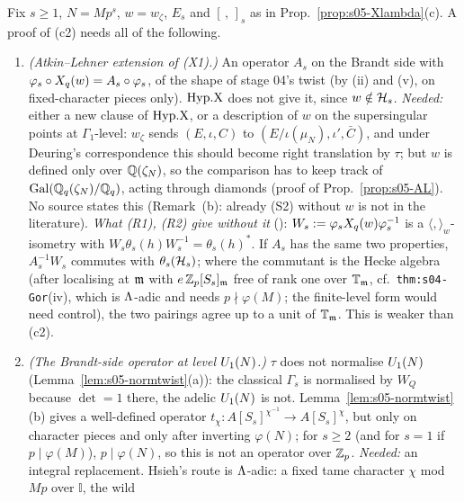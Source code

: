 \begin{remark}\label{rem:s05-c2open}
Fix $s\ge1$, $N=Mp^s$, $w=w_\zeta$, $E_s$ and $[\,,\,]_s$ as in Prop.~\ref{prop:s05-Xlambda}(c). A proof of (c2) needs all of the following.
\begin{enumerate}[label=(\roman*)]
\item \emph{(Atkin--Lehner extension of (X1).)} An operator $A_s$ on the Brandt side with $\varphi_s\circ X_q(w)=A_s\circ\varphi_s$, of the shape of stage 04's
  twist (by (ii) and (v), on fixed-character pieces only). $\mathrm{Hyp.X}$ does not give it, since $w\notin\mathcal{H}_s$. \emph{Needed:} either a new clause of $\mathrm{Hyp.X}$, or a
  description of $w$ on the supersingular points at $\Gamma_1$-level: $w_\zeta$ sends $(E,\iota,C)$ to $(E/\iota(\mu_N),\iota',\bar C)$, and under Deuring's
  correspondence this should become right translation by $\tau$; but $w$ is defined only over $\mathbb{Q}(\zeta_N)$, so the comparison has to keep track of
  $\mathrm{Gal}(\mathbb{Q}_q(\zeta_N)/\mathbb{Q}_q)$, acting through diamonds (proof of Prop.~\ref{prop:s05-AL}). No source states this (Remark~(b): already (S2) without $w$ is
  not in the literature). \emph{What (R1), (R2) give without it} (\stsketch): $W_s:=\varphi_sX_q(w)\varphi_s^{-1}$ is a $\langle,\rangle_w$-isometry with
  $W_s\theta_s(h)W_s^{-1}=\theta_s(h)^*$. If $A_s$ has the same two properties, $A_s^{-1}W_s$ commutes with $\theta_s(\mathcal{H}_s)$; where the commutant is the
  Hecke algebra (after localising at $\mathfrak{m}$ with $e\,\mathbb{Z}_p[S_s]_{\mathfrak{m}}$ free of rank one over $\mathbb{T}_{\mathfrak{m}}$, cf.\ \texttt{thm:s04-Gor}(iv), which is $\Lambda$-adic and needs
  $p\nmid\varphi(M)$; the finite-level form would need control), the two pairings agree up to a unit of $\mathbb{T}_{\mathfrak{m}}$. This is weaker than (c2).
\item \emph{(The Brandt-side operator at level $U_1(N)$.)} $\tau$ does not normalise $U_1(N)$ (Lemma~\ref{lem:s05-normtwist}(a)): the classical $\Gamma_s$ is
  normalised by $W_Q$ because $\det=1$ there, the adelic $U_1(N)$ is not. Lemma~\ref{lem:s05-normtwist}(b) gives a well-defined operator
  $t_\chi:A[S_s]^{\chi^{-1}}\to A[S_s]^\chi$, but only on character pieces and only after inverting $\varphi(N)$; for $s\ge2$ (and for $s=1$ if
  $p\mid\varphi(M)$), $p\mid\varphi(N)$, so this is not an operator over $\mathbb{Z}_p$. \emph{Needed:} an integral replacement. Hsieh's route is $\Lambda$-adic: a fixed tame character $\chi$ mod $Mp$ over $\mathbb I$, the wild

\end{enumerate}
\end{remark}

